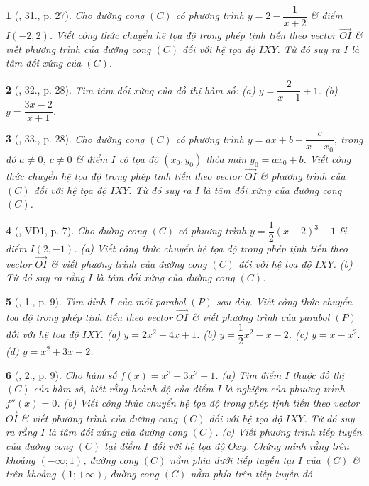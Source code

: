 \documentclass{article}
\newtheorem{baitoan}{}
\begin{document}
\begin{baitoan}[\cite{SGK_Toan_12_giai_tich_nang_cao}, 31., p. 27]
	Cho đường cong $(C)$ có phương trình $y = 2 - \dfrac{1}{x + 2}$ \& điểm $I(-2,2)$. Viết công thức chuyển hệ tọa độ trong phép tịnh tiến theo vector $\overrightarrow{OI}$ \& viết phương trình của đường cong $(C)$ đối với hệ tọa độ $IXY$. Từ đó suy ra $I$ là tâm đối xứng của $(C)$.
\end{baitoan}

\begin{baitoan}[\cite{SGK_Toan_12_giai_tich_nang_cao}, 32., p. 28]
	Tìm tâm đối xứng của đồ thị hàm số: (a) $y = \dfrac{2}{x - 1} + 1$. (b) $y = \dfrac{3x - 2}{x + 1}$.
\end{baitoan}

\begin{baitoan}[\cite{SGK_Toan_12_giai_tich_nang_cao}, 33., p. 28]
	Cho đường cong $(C)$ có phương trình $y = ax + b + \dfrac{c}{x - x_0}$, trong đó $a\ne0$, $c\ne0$ \& điểm $I$ có tọa độ $(x_0,y_0)$ thỏa mãn $y_0 = ax_0 + b$. Viết công thức chuyển hệ tọa độ trong phép tịnh tiến theo vector $\overrightarrow{OI}$ \& phương trình của $(C)$ đối với hệ tọa độ $IXY$. Từ đó suy ra $I$ là tâm đối xứng của đường cong $(C)$.
\end{baitoan}

\begin{baitoan}[\cite{TLCT_giai_tich_12}, VD1, p. 7]
	Cho đường cong $(C)$ có phương trình $y = \dfrac{1}{2}(x - 2)^3 - 1$ \& điểm $I(2,-1)$. (a) Viết công thức chuyển hệ tọa độ trong phép tịnh tiến theo vector $\overrightarrow{OI}$ \& viết phương trình của đường cong $(C)$ đối với hệ tọa độ $IXY$. (b) Từ đó suy ra rằng $I$ là tâm đối xứng của đường cong $(C)$.
\end{baitoan}

\begin{baitoan}[\cite{TLCT_giai_tich_12}, 1., p. 9]
	Tìm đỉnh $I$ của mỗi parabol $(P)$ sau đây. Viết công thức chuyển tọa độ trong phép tịnh tiến theo vector $\overrightarrow{OI}$ \& viết phương trình của parabol $(P)$ đối với hệ tọa độ $IXY$. (a) $y = 2x^2 - 4x + 1$. (b) $y = \dfrac{1}{2}x^2 - x - 2$. (c) $y = x - x^2$. (d) $y = x^2 + 3x + 2$.
\end{baitoan}

\begin{baitoan}[\cite{TLCT_giai_tich_12}, 2., p. 9]
	Cho hàm số $f(x) = x^3 - 3x^2 + 1$. (a) Tìm điểm $I$ thuộc đồ thị $(C)$ của hàm số, biết rằng hoành độ của điểm $I$ là nghiệm của phương trình $f''(x) = 0$. (b) Viết công thức chuyển hệ tọa độ trong phép tịnh tiến theo vector $\overrightarrow{OI}$ \& viết phương trình của đường cong $(C)$ đối với hệ tọa độ $IXY$. Từ đó suy ra rằng $I$ là tâm đối xứng của đường cong $(C)$. (c) Viết phương trình tiếp tuyến của đường cong $(C)$ tại điểm $I$ đối với hệ tọa độ $Oxy$. Chứng minh rằng trên khoảng $(-\infty;1)$, đường cong $(C)$ nằm phía dưới tiếp tuyến tại $I$ của $(C)$ \& trên khoảng $(1;+\infty)$, đường cong $(C)$ nằm phía trên tiếp tuyến đó.
\end{baitoan}
\end{document}
